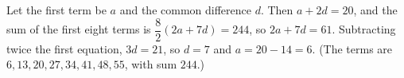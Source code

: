 Let the first term be $a$ and the common difference $d$. Then $a+2d=20$, and the sum of the first eight terms is $\dfrac{8}{2}\left(2a+7d\right)=244$, so $2a+7d=61$. Subtracting twice the first equation, $3d=21$, so $d=7$ and $a=20-14=\boxed{6}$. (The terms are $6,13,20,27,34,41,48,55$, with sum $244$.)
